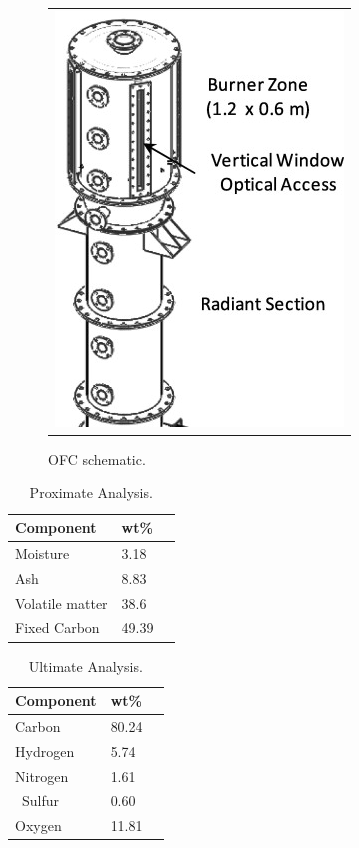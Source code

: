 \documentclass[12pt]{wssci}
\begin{document}
\begin{figure}
\begin{center}
\begin{tabular}{c}
\includegraphics[width=2 in]{../figures/OFC_pic.jpg}
\end{tabular}
\caption{OFC schematic.}
\label{f:OFC}
\end{center}
\end{figure}




\begin{table}[h]
	\caption{Proximate Analysis.}
	\label{t:prox}
	\centering
	\begin{tabular}{l l l}
	\hline
	Component & wt\% \\ \hline
    Moisture & 3.18 \\ 
    Ash & 8.83 \\ 
    Volatile matter & 38.6  \\ 
    Fixed Carbon & 49.39  \\ 
\hline
\end{tabular}
\end{table}


\begin{table}[!h]
	\caption{Ultimate Analysis.}
	\label{t:ult}
	\centering
	\begin{tabular}{l l l}
	\hline
	Component & wt\% \\ \hline
	Carbon & 80.24 \\ 
    Hydrogen & 5.74 \\ 
    Nitrogen & 1.61 \\ \
    Sulfur & 0.60 \\ 
    Oxygen & 11.81 \\ 
\hline
\end{tabular}
\end{table}
\end{document}
